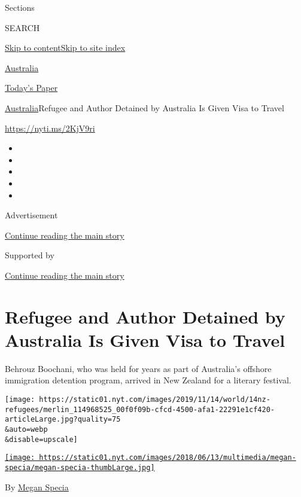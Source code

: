 Sections

SEARCH

\protect\hyperlink{site-content}{Skip to
content}\protect\hyperlink{site-index}{Skip to site index}

\href{https://www.nytimes.com/section/world/australia}{Australia}

\href{https://myaccount.nytimes.com/auth/login?response_type=cookie\&client_id=vi}{}

\href{https://www.nytimes.com/section/todayspaper}{Today's Paper}

\href{/section/world/australia}{Australia}\textbar{}Refugee and Author
Detained by Australia Is Given Visa to Travel

\url{https://nyti.ms/2KjV9ri}

\begin{itemize}
\item
\item
\item
\item
\item
\end{itemize}

Advertisement

\protect\hyperlink{after-top}{Continue reading the main story}

Supported by

\protect\hyperlink{after-sponsor}{Continue reading the main story}

\hypertarget{refugee-and-author-detained-by-australia-is-given-visa-to-travel}{%
\section{Refugee and Author Detained by Australia Is Given Visa to
Travel}\label{refugee-and-author-detained-by-australia-is-given-visa-to-travel}}

Behrouz Boochani, who was held for years as part of Australia's offshore
immigration detention program, arrived in New Zealand for a literary
festival.

\texttt{[image: https://static01.nyt.com/images/2019/11/14/world/14nz-refugees/merlin\_114968525\_00f0f09b-cfcd-4500-afa1-22291e1cf420-articleLarge.jpg?quality=75\\\&auto=webp\\\&disable=upscale]}

\href{https://www.nytimes.com/by/megan-specia}{\texttt{[image: https://static01.nyt.com/images/2018/06/13/multimedia/megan-specia/megan-specia-thumbLarge.jpg]}}

By \href{https://www.nytimes.com/by/megan-specia}{Megan Specia}

